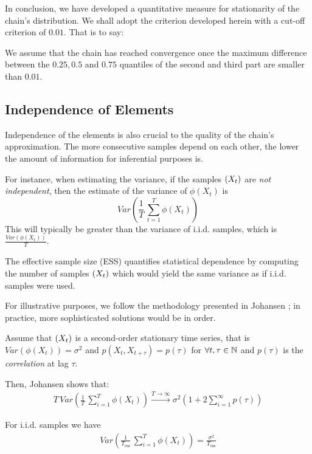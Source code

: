 In conclusion, we have developed a quantitative measure for stationarity of the chain's distribution. 
We shall adopt the criterion developed herein with a cut-off criterion of $0.01$. That is to say: 

\begin{center}
We assume that the chain has reached convergence once the maximum difference between the $0.25, 0.5$ and $0.75$ quantiles of the second and third part are smaller than $0.01$. 
\end{center}


\subsection{Independence of Elements}

Independence of the elements is also crucial to the quality of the chain's approximation. The more consecutive samples depend on each other, the lower the amount of information for inferential purposes is. 

For instance, when estimating the variance, if the samples $\left(X_t\right)$ are \textit{not independent}, then the estimate of the variance of $\phi(X_t)$ is 
\[
Var \left(	\frac{1}{T} \, \sum\limits_{t=1}^T \phi(X_t)\right)
\]
 This will typically be greater than the variance of i.i.d. samples, which is $\frac{Var\left(\phi(X_t) \right)}{T}$. 

The effective sample size (ESS) quantifies statistical dependence by computing the number of samples $\left(X_t\right)$ which would yield the same variance as if i.i.d. samples were used. 

For illustrative purposes, we follow the methodology presented in Johansen \cite{mcnotes}; in practice, more sophisticated solutions would be in order. 

Assume that $\left(X_t\right)$ is a second-order stationary time series, that is $Var \left( \phi(X_t)	\right) = \sigma^2$ and $p(X_t, X_{t+\tau}) = p(\tau)$ for $\forall t, \tau \in \mathbb{N}$ and $p(\tau)$ is the \textit{correlation} at lag $\tau$. 

Then, Johansen \cite{mcnotes} shows that:
\begin{align*}
	T \,  Var\left( 
		\frac{1}{T} \, \sum\limits_{i=1}^T \phi(X_t) 
	\right)
	\overset{T \rightarrow \infty}{\longrightarrow} 
	\sigma^2 \left(
		1 + 2 \sum\limits_{i=1}^\infty p(\tau)
	\right)
\end{align*}

For i.i.d. samples we have 
\begin{align*}
	 Var\left( 
	\frac{1}{T_{\text{ess}}} \, \sum\limits_{i=1}^T \phi(X_t) 
	\right) = \frac{\sigma^2}{T_{\text{ess}}}
\end{align*}

